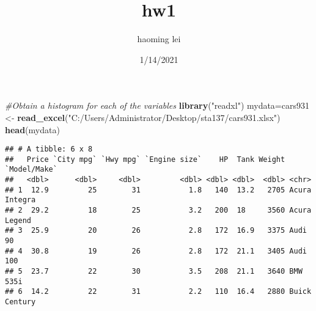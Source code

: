 \documentclass[
]{article}
\title{hw1}
\author{haoming lei}
\date{1/14/2021}
\newenvironment{Shaded}{\begin{snugshade}}{\end{snugshade}}
\newcommand{\CommentTok}[1]{\textcolor[rgb]{0.56,0.35,0.01}{\textit{#1}}}
\newcommand{\DataTypeTok}[1]{\textcolor[rgb]{0.13,0.29,0.53}{#1}}
\newcommand{\KeywordTok}[1]{\textcolor[rgb]{0.13,0.29,0.53}{\textbf{#1}}}
\newcommand{\NormalTok}[1]{#1}
\newcommand{\OperatorTok}[1]{\textcolor[rgb]{0.81,0.36,0.00}{\textbf{#1}}}
\newcommand{\StringTok}[1]{\textcolor[rgb]{0.31,0.60,0.02}{#1}}
\begin{document}
\maketitle

\begin{Shaded}
\begin{Highlighting}[]
\CommentTok{#Obtain a histogram for each of the variables}
\KeywordTok{library}\NormalTok{(}\StringTok{"readxl"}\NormalTok{)}
\NormalTok{mydata=cars931 <-}\StringTok{ }\KeywordTok{read_excel}\NormalTok{(}\StringTok{"C:/Users/Administrator/Desktop/sta137/cars931.xlsx"}\NormalTok{)}
\KeywordTok{head}\NormalTok{(mydata)}
\end{Highlighting}
\end{Shaded}

\begin{verbatim}
## # A tibble: 6 x 8
##   Price `City mpg` `Hwy mpg` `Engine size`    HP  Tank Weight `Model/Make` 
##   <dbl>      <dbl>     <dbl>         <dbl> <dbl> <dbl>  <dbl> <chr>        
## 1  12.9         25        31           1.8   140  13.2   2705 Acura Integra
## 2  29.2         18        25           3.2   200  18     3560 Acura Legend 
## 3  25.9         20        26           2.8   172  16.9   3375 Audi 90      
## 4  30.8         19        26           2.8   172  21.1   3405 Audi 100     
## 5  23.7         22        30           3.5   208  21.1   3640 BMW 535i     
## 6  14.2         22        31           2.2   110  16.4   2880 Buick Century
\end{verbatim}

\begin{Shaded}
\end{Shaded}
\end{document}
